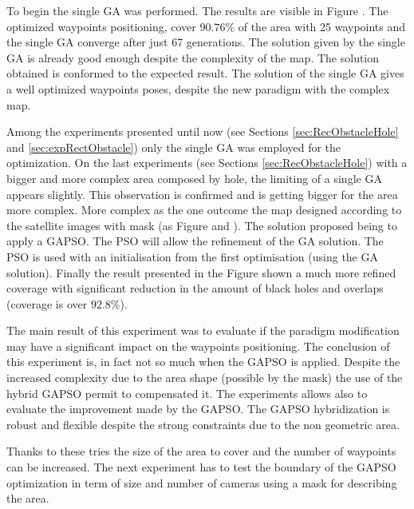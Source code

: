  To begin the single GA was performed. The results are visible in Figure . The optimized waypoints positioning, cover $90.76\%$ of the area with 25 waypoints and the single GA converge after just 67 generations. The solution given by the single GA is already good enough despite the complexity of the map. 
  The solution obtained is conformed to the expected result. The solution of the single GA gives a well optimized waypoints poses, despite the new paradigm with the complex map. 
  
   Among the experiments presented until now (see Sections \ref{sec:RecObstacleHole} and \ref{sec:expRectObstacle}) only the single GA was employed for the optimization. On the last experiments (see Sections \ref{sec:RecObstacleHole}) with a bigger and more complex area composed by hole, the limiting of a single GA appears slightly. This observation is confirmed and is getting bigger for the area more complex. More complex as the one outcome the map designed according to the satellite images with mask (as  Figure  and ).
The solution proposed being to apply a GAPSO. The PSO will allow the refinement of the GA solution.
The PSO is used with an initialisation from the first optimisation (using  the GA solution). 
Finally the result presented in the Figure  shown a much more refined coverage with significant reduction in the amount of black holes and overlaps (coverage is over $92.8\%$). 

The main result of this experiment was to evaluate if the paradigm modification may have a significant impact on the waypoints positioning.
 The conclusion of this experiment is, in fact not so much when the GAPSO is applied. Despite the increased complexity due to the area shape (possible by the mask) the use of the hybrid GAPSO permit to compensated it. The experiments allows also to evaluate the improvement made by the GAPSO. The GAPSO hybridization is robust and flexible despite the strong constraints due to the non geometric area.  

Thanks to these tries the size of the area to cover and the number of waypoints can be increased. The next experiment has to test the boundary of the GAPSO optimization in term of size and number of cameras using a mask for describing the area.



